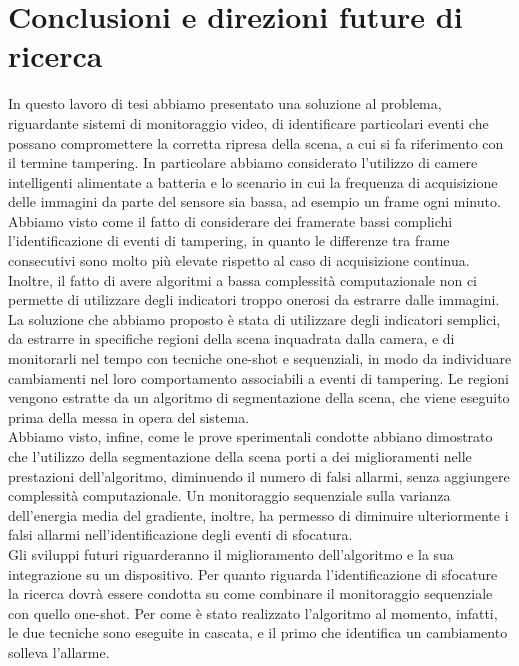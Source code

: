 \chapter{Conclusioni e direzioni future di ricerca}
\label{Conclusioni}
\thispagestyle{empty}

\noindent In questo lavoro di tesi abbiamo presentato una soluzione al problema, riguardante sistemi di monitoraggio video, di identificare particolari eventi che possano compromettere la corretta ripresa della scena, a cui si fa riferimento con il termine tampering.
In particolare abbiamo considerato l'utilizzo di camere intelligenti alimentate a batteria e lo scenario in cui la frequenza di acquisizione delle immagini da parte del sensore sia bassa, ad esempio un frame ogni minuto.\\
Abbiamo visto come il fatto di considerare dei framerate bassi complichi l'identificazione di eventi di tampering, in quanto le differenze tra frame consecutivi sono molto pi\`u elevate rispetto al caso di acquisizione continua. 
Inoltre, il fatto di avere algoritmi a bassa complessit\`a computazionale non ci permette di utilizzare degli indicatori troppo onerosi da estrarre dalle immagini.\\
La soluzione che abbiamo proposto \`e stata di utilizzare degli indicatori semplici, da estrarre in specifiche regioni della scena inquadrata dalla camera, e di monitorarli nel tempo con tecniche one-shot e sequenziali, in modo da individuare cambiamenti nel loro comportamento associabili a eventi di tampering.
Le regioni vengono estratte da un algoritmo di segmentazione della scena, che viene eseguito prima della messa in opera del sistema.\\
Abbiamo visto, infine, come le prove sperimentali condotte abbiano dimostrato che l'utilizzo della segmentazione della scena porti a dei miglioramenti nelle prestazioni dell'algoritmo, diminuendo il numero di falsi allarmi, senza aggiungere complessit\`a computazionale.
Un monitoraggio sequenziale sulla varianza dell'energia media del gradiente, inoltre, ha permesso di diminuire ulteriormente i falsi allarmi nell'identificazione degli eventi di sfocatura.\\
Gli sviluppi futuri riguarderanno il miglioramento dell'algoritmo e la sua integrazione su un dispositivo.
Per quanto riguarda l'identificazione di sfocature la ricerca dovr\`a essere condotta su come combinare il monitoraggio sequenziale con quello one-shot.
Per come \`e stato realizzato l'algoritmo al momento, infatti, le due tecniche sono eseguite in cascata, e il primo che identifica un cambiamento solleva l'allarme.
